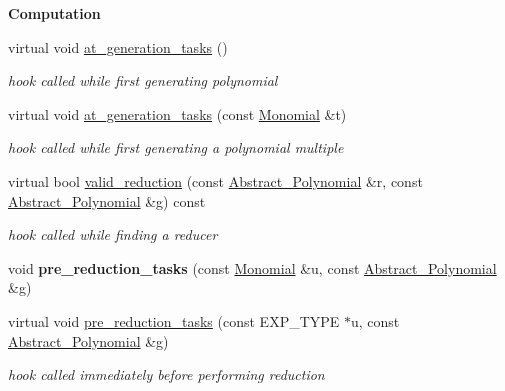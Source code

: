 \begin{Indent}\textbf{ Computation}\par
\begin{DoxyCompactItemize}
\item 
virtual void \hyperlink{class_poly___strategy___data_a3c2e31f0e3323da59564edc6ee3557af}{at\+\_\+generation\+\_\+tasks} ()
\begin{DoxyCompactList}\small\item\em hook called while first generating polynomial \end{DoxyCompactList}\item 
virtual void \hyperlink{class_poly___strategy___data_a6683749a5fb30b6f91075a28899fbfe7}{at\+\_\+generation\+\_\+tasks} (const \hyperlink{class_monomial}{Monomial} \&t)
\begin{DoxyCompactList}\small\item\em hook called while first generating a polynomial {\itshape multiple} \end{DoxyCompactList}\item 
virtual bool \hyperlink{class_poly___strategy___data_a996754ff163b0ff32d783ec723ac35be}{valid\+\_\+reduction} (const \hyperlink{class_abstract___polynomial}{Abstract\+\_\+\+Polynomial} \&r, const \hyperlink{class_abstract___polynomial}{Abstract\+\_\+\+Polynomial} \&g) const
\begin{DoxyCompactList}\small\item\em hook called while finding a reducer \end{DoxyCompactList}\item 
\mbox{\label{class_poly___strategy___data_a27fb1565f1c569ca28f01021551a1353}} 
void {\bfseries pre\+\_\+reduction\+\_\+tasks} (const \hyperlink{class_monomial}{Monomial} \&u, const \hyperlink{class_abstract___polynomial}{Abstract\+\_\+\+Polynomial} \&g)
\item 
virtual void \hyperlink{class_poly___strategy___data_a0d71db50c58a24f48f94eae6a48c2149}{pre\+\_\+reduction\+\_\+tasks} (const E\+X\+P\+\_\+\+T\+Y\+PE $\ast$u, const \hyperlink{class_abstract___polynomial}{Abstract\+\_\+\+Polynomial} \&g)
\begin{DoxyCompactList}\small\item\em hook called immediately before performing reduction \end{DoxyCompactList}\end{DoxyCompactItemize}
\end{Indent}
